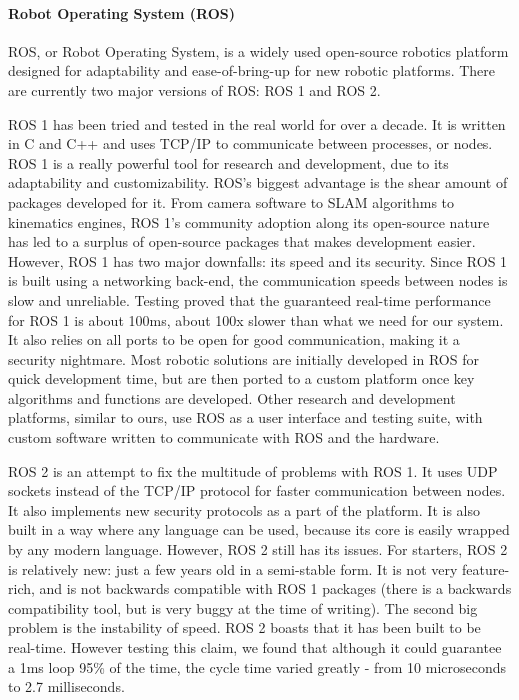 \paragraph*{Robot Operating System (ROS)}
ROS, or Robot Operating System, is a widely used open-source robotics platform designed for adaptability and ease-of-bring-up for new robotic platforms. There are currently two major versions of ROS: ROS 1 and ROS 2.

ROS 1 has been tried and tested in the real world for over a decade. It is written in C and C++ and uses TCP/IP to communicate between processes, or nodes. ROS 1 is a really powerful tool for research and development, due to its adaptability and customizability. ROS's biggest advantage is the shear amount of packages developed for it. From camera software to SLAM algorithms to kinematics engines, ROS 1's community adoption along its open-source nature has led to a surplus of open-source packages that makes development easier. However, ROS 1 has two major downfalls: its speed and its security. Since ROS 1 is built using a networking back-end, the communication speeds between nodes is slow and unreliable. Testing proved that the guaranteed real-time performance for ROS 1 is about 100ms, about 100x slower than what we need for our system. It also relies on all ports to be open for good communication, making it a security nightmare. Most robotic solutions are initially developed in ROS for quick development time, but are then ported to a custom platform once key algorithms and functions are developed. Other research and development platforms, similar to ours, use ROS as a user interface and testing suite, with custom software written to communicate with ROS and the hardware.

ROS 2 is an attempt to fix the multitude of problems with ROS 1. It uses UDP sockets instead of the TCP/IP protocol for faster communication between nodes. It also implements new security protocols as a part of the platform. It is also built in a way where any language can be used, because its core is easily wrapped by any modern language. 
However, ROS 2 still has its issues. For starters, ROS 2 is relatively new: just a few years old in a semi-stable form. It is not very feature-rich, and is not backwards compatible with ROS 1 packages (there is a backwards compatibility tool, but is very buggy at the time of writing). The second big problem is the instability of speed. ROS 2 boasts that it has been built to be real-time. However testing this claim, we found that although it could guarantee a 1ms loop 95\% of the time, the cycle time varied greatly - from 10 microseconds to 2.7 milliseconds.

